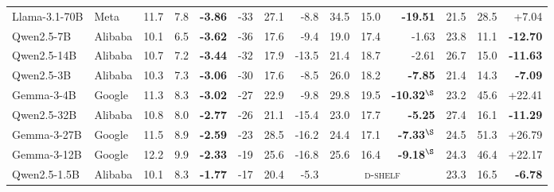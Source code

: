 \begin{table}[tb]
\begin{tabular}{llrrrrrr@{\hspace{5pt}}rrr@{\hspace{5pt}}rrr}
Llama-3.1-70B & Meta & 11.7 & 7.8 & \textbf{-3.86} & -33 & 27.1 & -8.8 & 34.5 & 15.0 & \textbf{-19.51} & 21.5 & 28.5 & +7.04 \\
Qwen2.5-7B & Alibaba & 10.1 & 6.5 & \textbf{-3.62} & -36 & 17.6 & -9.4 & 19.0 & 17.4 & -1.63 & 23.8 & 11.1 & \textbf{-12.70} \\
Qwen2.5-14B & Alibaba & 10.7 & 7.2 & \textbf{-3.44} & -32 & 17.9 & -13.5 & 21.4 & 18.7 & -2.61 & 26.7 & 15.0 & \textbf{-11.63} \\
Qwen2.5-3B & Alibaba & 10.3 & 7.3 & \textbf{-3.06} & -30 & 17.6 & -8.5 & 26.0 & 18.2 & \textbf{-7.85} & 21.4 & 14.3 & \textbf{-7.09} \\
Gemma-3-4B & Google & 11.3 & 8.3 & \textbf{-3.02} & -27 & 22.9 & -9.8 & 29.8 & 19.5 & \textbf{-10.32}$^{\S}$ & 23.2 & 45.6 & +22.41 \\
Qwen2.5-32B & Alibaba & 10.8 & 8.0 & \textbf{-2.77} & -26 & 21.1 & -15.4 & 23.0 & 17.7 & \textbf{-5.25} & 27.4 & 16.1 & \textbf{-11.29} \\
Gemma-3-27B & Google & 11.5 & 8.9 & \textbf{-2.59} & -23 & 28.5 & -16.2 & 24.4 & 17.1 & \textbf{-7.33}$^{\S}$ & 24.5 & 51.3 & +26.79 \\
Gemma-3-12B & Google & 12.2 & 9.9 & \textbf{-2.33} & -19 & 25.6 & -16.8 & 25.6 & 16.4 & \textbf{-9.18}$^{\S}$ & 24.3 & 46.4 & +22.17 \\
Qwen2.5-1.5B & Alibaba & 10.1 & 8.3 & \textbf{-1.77} & -17 & 20.4 & -5.3 & \multicolumn{3}{c}{\textsc{d-shelf}} & 23.3 & 16.5 & \textbf{-6.78} \\
\bottomrule
\end{tabular}
\end{table}
